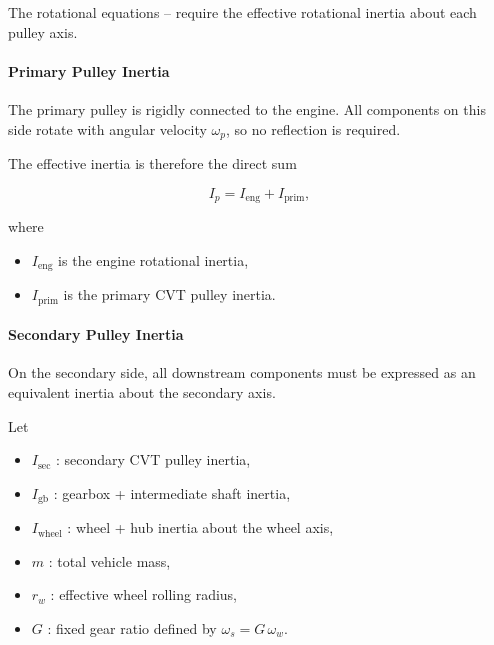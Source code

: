 \documentclass[11pt]{article}
\numberwithin{equation}{section}
\begin{document}
The rotational equations --
require the effective rotational inertia about each pulley axis.

\paragraph{Primary Pulley Inertia}

The primary pulley is rigidly connected to the engine.
All components on this side rotate with angular velocity $\omega_p$,
so no reflection is required.

The effective inertia is therefore the direct sum

\begin{equation}
I_p
=
I_{\text{eng}}
+
I_{\text{prim}},
\label{eq:Ip_def}
\end{equation}

where
\begin{itemize}
    \item $I_{\text{eng}}$ is the engine rotational inertia,
    \item $I_{\text{prim}}$ is the primary CVT pulley inertia.
\end{itemize}

\paragraph{Secondary Pulley Inertia}

On the secondary side, all downstream components must be
expressed as an equivalent inertia about the secondary axis.

Let

\begin{itemize}
    \item $I_{\text{sec}}$ : secondary CVT pulley inertia,
    \item $I_{\text{gb}}$ : gearbox + intermediate shaft inertia,
    \item $I_{\text{wheel}}$ : wheel + hub inertia about the wheel axis,
    \item $m$ : total vehicle mass,
    \item $r_w$ : effective wheel rolling radius,
    \item $G$ : fixed gear ratio defined by $\omega_s = G\,\omega_w$.
\end{itemize}

\end{document}
